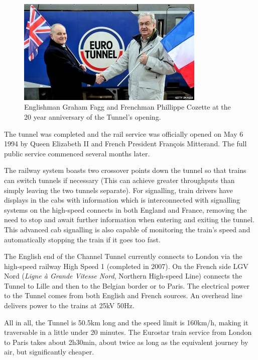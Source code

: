 \documentclass[12pt]{article} %
\begin{document}
\begin{figure}[tp]
  \centering
  \includegraphics[width=0.8\textwidth]{20years}
  \caption{Englishman Graham Fagg and Frenchman Phillippe Cozette at the 20 year anniversary of the Tunnel's opening.}
  \label{fig:20y}
\end{figure}

The tunnel was completed and the rail service was officially opened on May 6 1994 by Queen Elizabeth II and French President François Mitterand. The full public service commenced several months later.

The railway system boasts two crossover points down the tunnel so that trains can switch tunnels if necessary (This can achieve greater throughputs than simply leaving the two tunnels separate). For signalling, train drivers have displays in the cabs with information which is interconnected with signalling systems on the high-speed connects in both England and France, removing the need to stop and await further information when entering and exiting the tunnel. This advanced cab signalling is also capable of monitoring the train's speed and automatically stopping the train if it goes too fast.

The English end of the Channel Tunnel currently connects to London via the high-speed railway High Speed 1 (completed in 2007). On the French side LGV Nord (\emph{Ligne à Grande Vitesse Nord}, Northern High-speed Line) connects the Tunnel to Lille and then to the Belgian border or to Paris. The electrical power to the Tunnel comes from both English and French sources. An overhead line delivers power to the trains at 25kV 50Hz.

All in all, the Tunnel is 50.5km long and the speed limit is 160km/h, making it traversable in a little under 20 minutes. The Eurostar train service from London to Paris takes about 2h30min, about twice as long as the equivalent journey by air, but significantly cheaper.
\end{document}
